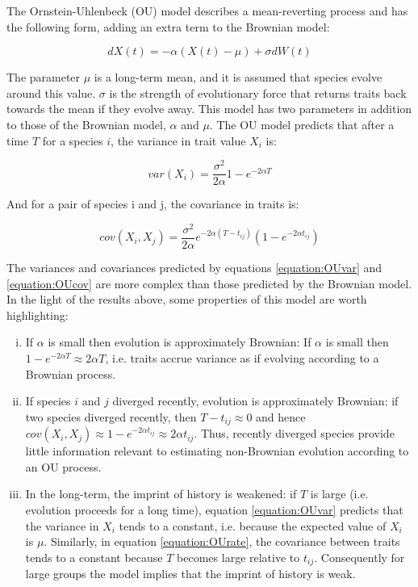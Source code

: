 \documentclass[a4paper,12pt]{article}
\begin{document}
  The Ornstein-Uhlenbeck (OU) model describes a mean-reverting process and has the following form, adding an extra term to the Brownian model:

  \begin{equation}
    dX(t) = - \alpha (X(t) - \mu) + \sigma dW(t)
    \label{equation:OUrate} 
  \end{equation}

  The parameter $\mu$ is a long-term mean, and it is assumed that species evolve around this value. 
  $\sigma$ is the strength of evolutionary force that returns traits back towards the mean if they evolve away. 
  This model has two parameters in addition to those of the Brownian model, $\alpha$ and $\mu$.
  The OU model predicts that after a time $T$ for a species $i$, the variance in trait value $X_i$ is:

    \begin{equation}
      var(X_i) = \frac{\sigma^2}{2 \alpha} 1 - e^{-2 \alpha T}
      \label{equation:OUvar} 
    \end{equation}

  And for a pair of species i and j, the covariance in traits is:

    \begin{equation}
      cov(X_i, X_j) = \frac{\sigma^2}{2 \alpha} e^{-2 \alpha (T - t_{ij})} (1 - e^{-2\alpha t_{ij}})
      \label{equation:OUcov} 
    \end{equation}

  The variances and covariances predicted by equations \ref{equation:OUvar} and \ref{equation:OUcov} are more complex than those predicted by the Brownian model. 
  In the light of the results above, some properties of this model are worth highlighting:

  \begin{enumerate}[(i)]
    \item If $\alpha$ is small then evolution is approximately Brownian: If $\alpha$ is small then $1 - e^{-2\alpha T} \approx 2\alpha T$, i.e. traits accrue variance as if evolving according to a Brownian process.\\ 

    \item If species $i$ and $j$ diverged recently, evolution is approximately Brownian: if two species diverged recently, then $T - t_{ij} \approx 0$ and hence $cov(X_i, X_j) \approx 1 - e^{-2\alpha t_{ij}} \approx 2\alpha t_{ij}$. 
    Thus, recently diverged species provide little information relevant to estimating non-Brownian evolution according to an OU process.\\ 

    \item In the long-term, the imprint of history is weakened: if $T$ is large (i.e. evolution proceeds for a long time), equation \ref{equation:OUvar} predicts that the variance in $X_i$ tends to a constant, i.e. because the expected value of $X_i$ is $\mu$. 
    Similarly, in equation \ref{equation:OUrate}, the covariance between traits tends to a constant because $T$ becomes large relative to $t_{ij}$.
    Consequently for large groups the model implies that the imprint of history is weak.\\
  \end{enumerate}
\end{document}
